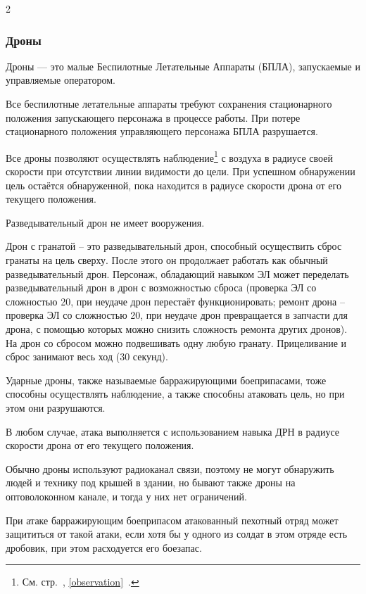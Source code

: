 \documentclass[twoside]{article}
\begin{document}
\begin{multicols}{2}
\subsubsection{Дроны}\label{drones}

Дроны --- это малые Беспилотные Летательные Аппараты (БПЛА), запускаемые
и управляемые оператором.

Все беспилотные летательные аппараты требуют сохранения стационарного
положения запускающего персонажа в процессе работы. При потере
стационарного положения управляющего персонажа БПЛА разрушается.

Все дроны позволяют осуществлять наблюдение\footnote{См. стр.~\pageref{observation}, \ref{observation}~.} с воздуха в радиусе своей скорости при отсутствии
линии видимости до цели. При успешном обнаружении цель остаётся
обнаруженной, пока находится в радиусе скорости дрона от его текущего
положения.

Разведывательный дрон не имеет вооружения.

Дрон с гранатой -- это разведывательный дрон, способный осуществить
сброс гранаты на цель сверху. После этого он продолжает работать как
обычный разведывательный дрон. Персонаж, обладающий навыком ЭЛ может
переделать разведывательный дрон в дрон с возможностью сброса (проверка
ЭЛ со сложностью 20, при неудаче дрон перестаёт функционировать; ремонт
дрона -- проверка ЭЛ со сложностью 20, при неудаче дрон превращается в
запчасти для дрона, с помощью которых можно снизить сложность ремонта
других дронов). На дрон со сбросом можно подвешивать одну любую гранату.
Прицеливание и сброс занимают весь ход (30 секунд).

Ударные дроны, также называемые барражирующими боеприпасами, тоже
способны осуществлять наблюдение, а также способны атаковать цель, но
при этом они разрушаются.

В любом случае, атака выполняется с использованием навыка ДРН в радиусе
скорости дрона от его текущего положения.

Обычно дроны используют радиоканал связи, поэтому не могут обнаружить
людей и технику под крышей в здании, но бывают также дроны на
оптоволоконном канале, и тогда у них нет ограничений.

При атаке барражирующим боеприпасом атакованный пехотный отряд может
защититься от такой атаки, если хотя бы у одного из солдат в этом отряде
есть дробовик, при этом расходуется его боезапас.


\end{multicols}
\end{document}
